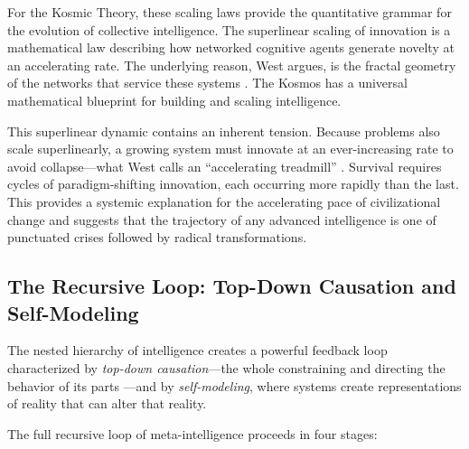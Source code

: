 \documentclass[12pt,a4paper]{article}
\begin{document}
For the Kosmic Theory, these scaling laws provide the quantitative grammar
for the evolution of collective intelligence.  The superlinear scaling of
innovation is a mathematical law describing how networked cognitive agents
generate novelty at an accelerating rate.  The underlying reason, West
argues, is the fractal geometry of the networks that service these systems
\citep{west2017}.  The Kosmos has a universal mathematical blueprint for
building and scaling intelligence.

This superlinear dynamic contains an inherent tension.  Because problems
also scale superlinearly, a growing system must innovate at an
ever-increasing rate to avoid collapse---what West calls an ``accelerating
treadmill'' \citep{west2017}.  Survival requires cycles of
paradigm-shifting innovation, each occurring more rapidly than the last.
This provides a systemic explanation for the accelerating pace of
civilizational change and suggests that the trajectory of any advanced
intelligence is one of punctuated crises followed by radical
transformations.

\subsection{The Recursive Loop: Top-Down Causation and Self-Modeling}
\label{sec:loop}

The nested hierarchy of intelligence creates a powerful feedback loop
characterized by \emph{top-down causation}---the whole constraining and
directing the behavior of its parts \citep{auletta2013,ellis2016}---and by
\emph{self-modeling}, where systems create representations of reality that
can alter that reality.

The full recursive loop of meta-intelligence proceeds in four stages:
\end{document}
